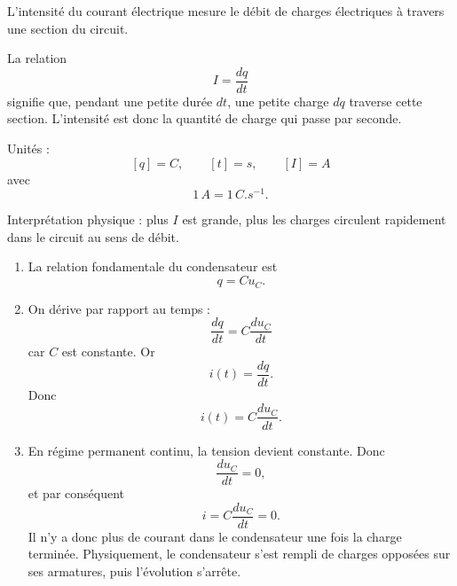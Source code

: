 \documentclass[11pt,a4paper]{article}
\begin{document}
\begin{corrigebox}
L'intensité du courant électrique mesure le débit de charges électriques à travers une section du circuit.

La relation
\[
I=\frac{dq}{dt}
\]
signifie que, pendant une petite durée \(dt\), une petite charge \(dq\) traverse cette section. L'intensité est donc la quantité de charge qui passe par seconde.

Unités :
\[
[q]=\si{C}, \qquad [t]=\si{s}, \qquad [I]=\si{A}
\]
avec
\[
1\,\si{A}=1\,\si{C.s^{-1}}.
\]

Interprétation physique : plus \(I\) est grande, plus les charges circulent rapidement dans le circuit au sens de débit.
\end{corrigebox}

\begin{corrigebox}
\begin{enumerate}[label=\alph*)]
    \item La relation fondamentale du condensateur est
    \[
    q=Cu_C.
    \]

    \item On dérive par rapport au temps :
    \[
    \frac{dq}{dt}=C\frac{du_C}{dt}
    \]
    car \(C\) est constante. Or
    \[
    i(t)=\frac{dq}{dt}.
    \]
    Donc
    \[
    i(t)=C\frac{du_C}{dt}.
    \]

    \item En régime permanent continu, la tension devient constante. Donc
    \[
    \frac{du_C}{dt}=0,
    \]
    et par conséquent
    \[
    i= C\frac{du_C}{dt}=0.
    \]
    Il n'y a donc plus de courant dans le condensateur une fois la charge terminée. Physiquement, le condensateur s'est rempli de charges opposées sur ses armatures, puis l'évolution s'arrête.
\end{enumerate}
\end{corrigebox}
\end{document}

